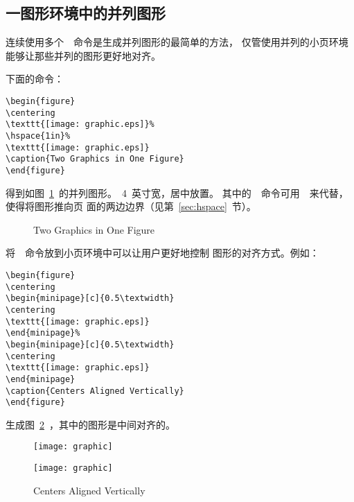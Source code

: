 \subsection{一图形环境中的并列图形}\label{ssec:sidegraphics}

连续使用多个~~命令是生成并列图形的最简单的方法，
仅管使用并列的小页环境能够让那些并列的图形更好地对齐。

下面的命令：
\begin{Verbatim}[xleftmargin=1cm]
\begin{figure} 
\centering 
\texttt{[image: graphic.eps]}% 
\hspace{1in}% 
\texttt{[image: graphic.eps]} 
\caption{Two Graphics in One Figure} 
\end{figure}
\end{Verbatim}
得到如图~\ref{fig:sidegraphics}~的并列图形。~4~英寸宽，居中放置。
其中的~~命令可用~~来代替，使得将图形推向页
面的两边边界（见第~\ref{sec:hspace}~节）。

\begin{figure} 
	\centering 
	\resizebox{1in}{!}{\usebox{\graphic}}%
	\hspace{1in}%
	\resizebox{2in}{!}{\usebox{\graphic}}
	\caption{Two Graphics in One Figure} 
	\label{fig:sidegraphics}
\end{figure}

将~~命令放到小页环境中可以让用户更好地控制
图形的对齐方式。例如：
\begin{Verbatim}[xleftmargin=1cm]
\begin{figure} 
\centering 
\begin{minipage}[c]{0.5\textwidth} 
\centering 
\texttt{[image: graphic.eps]} 
\end{minipage}% 
\begin{minipage}[c]{0.5\textwidth} 
\centering 
\texttt{[image: graphic.eps]} 
\end{minipage} 
\caption{Centers Aligned Vertically} 
\end{figure}
\end{Verbatim}
生成图~\ref{fig:minipagegraphics}~，其中的图形是中间对齐的。

\begin{figure} 
	\centering 
	\begin{minipage}[c]{0.5\textwidth} 
		\centering 
		\texttt{[image: graphic]}
	\end{minipage}%
	\begin{minipage}[c]{0.5\textwidth} 
		\centering 
		\texttt{[image: graphic]}
	\end{minipage} 
	\caption{Centers Aligned Vertically} 
	\label{fig:minipagegraphics}
\end{figure}

